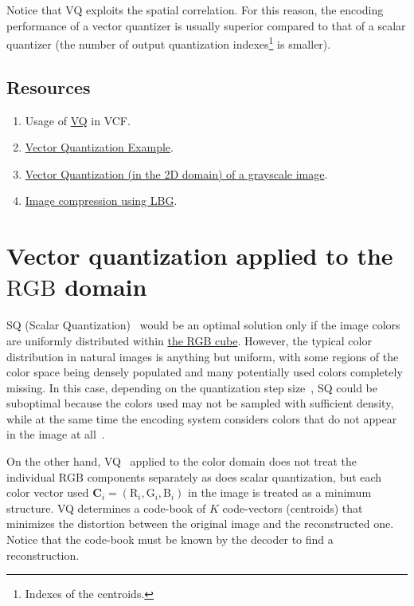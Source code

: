 Notice that VQ exploits the spatial correlation. For this reason, the
encoding performance of a vector quantizer is usually superior
compared to that of a scalar quantizer (the number of output
quantization indexes\footnote{Indexes of the centroids.} is smaller).

\subsection*{Resources}

\begin{enumerate}
\item Usage of \href{https://github.com/Sistemas-Multimedia/VCF/blob/main/notebooks/VQ.ipynb}{VQ} in VCF.
\item
  \href{https://scikit-learn.org/stable/auto_examples/cluster/plot_face_compress.html#sphx-glr-auto-examples-cluster-plot-face-compress-py}{Vector
    Quantization Example}.
\item
  \href{https://github.com/vicente-gonzalez-ruiz/vector_quantization/blob/main/docs/gray_VQ.ipynb}{Vector
    Quantization (in the 2D domain) of a grayscale image}.
\item \href{https://github.com/droidadroit/LBG}{Image compression using LBG}.
\end{enumerate}


\section{Vector quantization applied to the $\text{RGB}$ domain}

SQ (Scalar
Quantization)~\cite{vruiz__scalar_quantization,sayood2017introduction}
would be an optimal solution only if the image colors are uniformly
distributed within
\href{https://en.wikipedia.org/wiki/RGB_color_model}{the RGB
  cube}. However, the typical color distribution in natural images is
anything but uniform, with some regions of the color space being
densely populated and many potentially used colors completely
missing. In this case, depending on the quantization step
size~\cite{vruiz__signal_quantization}, SQ could be suboptimal because
the colors used may not be sampled with sufficient density, while at the
same time the encoding system considers colors that do not appear
in the image at all~\cite{burger2016digital}.

On the other hand, VQ~\cite{vruiz__vector_quantization,sayood2017introduction}
applied to the color domain does not treat the individual $\text{RGB}$
components separately as does scalar quantization, but each color
vector used ${\mathbf C}_i = (\text{R}_i, \text{G}_i, \text{B}_i )$ in
the image is treated as a minimum structure. VQ determines a code-book
of $K$ code-vectors (centroids) that minimizes the distortion between
the original image and the reconstructed one. Notice that the
code-book must be known by the decoder to find a reconstruction.

